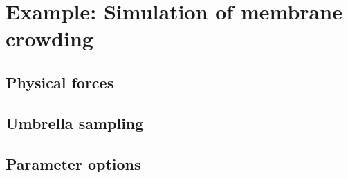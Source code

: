 
\section{ Example: Simulation of membrane crowding }

\subsection{Physical forces}

\subsection{Umbrella sampling}

\subsection{Parameter options}

